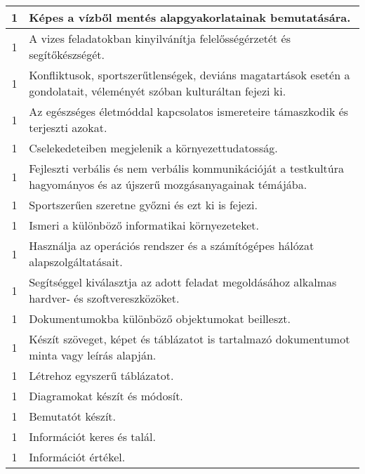\begin{longtable}{c | p{12cm} }
                                          1 &  Képes a vízből mentés alapgyakorlatainak bemutatására. \\ \hline
                                          1 &  A vizes feladatokban kinyilvánítja felelősségérzetét és segítőkészségét. \\ \hline
                                          1 &  Konfliktusok, sportszerűtlenségek, deviáns magatartások esetén a gondolatait, véleményét szóban kulturáltan fejezi ki. \\ \hline
                                          1 &  Az egészséges életmóddal kapcsolatos ismereteire támaszkodik és terjeszti azokat. \\ \hline
                                          1 &  Cselekedeteiben megjelenik a környezettudatosság. \\ \hline
                                          1 &  Fejleszti verbális és nem verbális kommunikációját a testkultúra hagyományos és az újszerű mozgásanyagainak témájába. \\ \hline
                                          1 &  Sportszerűen szeretne győzni és ezt ki is fejezi. \\ \hline
                                          1 &  Ismeri a különböző informatikai környezeteket. \\ \hline
                                          1 &  Használja az operációs rendszer és a számítógépes hálózat alapszolgáltatásait. \\ \hline
                                          1 &  Segítséggel kiválasztja az adott feladat megoldásához alkalmas hardver- és szoftvereszközöket. \\ \hline
                                          1 &  Dokumentumokba különböző objektumokat beilleszt. \\ \hline
                                          1 &  Készít szöveget, képet és táblázatot is tartalmazó dokumentumot minta vagy leírás alapján. \\ \hline
                                          1 &  Létrehoz egyszerű táblázatot. \\ \hline
                                          1 &  Diagramokat készít és módosít. \\ \hline
                                          1 &  Bemutatót készít. \\ \hline
                                          1 &  Információt keres és talál. \\ \hline
                                          1 &  Információt értékel. \\ \hline

\end{longtable}
